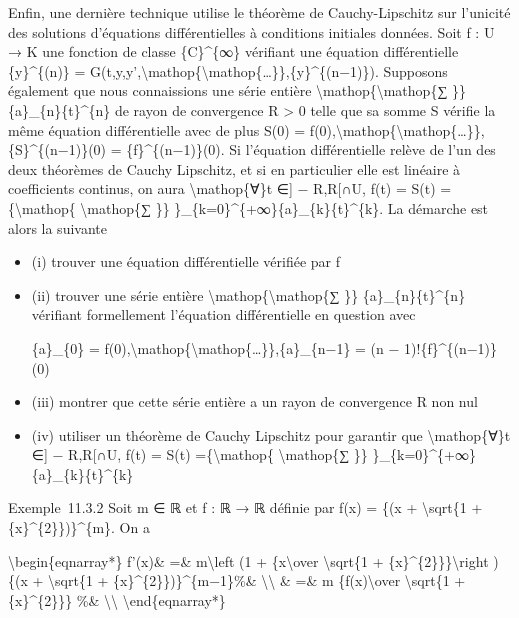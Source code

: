 \documentclass[]{article}
\begin{document}
Enfin, une dernière technique utilise le théorème de Cauchy-Lipschitz
sur l'unicité des solutions d'équations différentielles à conditions
initiales données. Soit f : U → K une fonction de classe \{C\}\^{}\{∞\}
vérifiant une équation différentielle \{y\}\^{}\{(n)\} =
G(t,y,y',\textbackslash{}mathop\{\textbackslash{}mathop\{\ldots{}\}\},\{y\}\^{}\{(n−1)\}).
Supposons également que nous connaissions une série entière
\textbackslash{}mathop\{\textbackslash{}mathop\{∑ \}\}
\{a\}\_\{n\}\{t\}\^{}\{n\} de rayon de convergence R \textgreater{} 0
telle que sa somme S vérifie la même équation différentielle avec de
plus S(0) =
f(0),\textbackslash{}mathop\{\textbackslash{}mathop\{\ldots{}\}\},\{S\}\^{}\{(n−1)\}(0)
= \{f\}\^{}\{(n−1)\}(0). Si l'équation différentielle relève de l'un des
deux théorèmes de Cauchy Lipschitz, et si en particulier elle est
linéaire à coefficients continus, on aura \textbackslash{}mathop\{∀\}t
∈{]} − R,R{[}∩U, f(t) = S(t) =\{\textbackslash{}mathop\{
\textbackslash{}mathop\{∑ \}\}
\}\_\{k=0\}\^{}\{+∞\}\{a\}\_\{k\}\{t\}\^{}\{k\}. La démarche est alors
la suivante

\begin{itemize}
\item
  (i) trouver une équation différentielle vérifiée par f
\item
  (ii) trouver une série entière
  \textbackslash{}mathop\{\textbackslash{}mathop\{∑ \}\}
  \{a\}\_\{n\}\{t\}\^{}\{n\} vérifiant formellement l'équation
  différentielle en question avec

  \{a\}\_\{0\} =
  f(0),\textbackslash{}mathop\{\textbackslash{}mathop\{\ldots{}\}\},\{a\}\_\{n−1\}
  = (n − 1)!\{f\}\^{}\{(n−1)\}(0)
\item
  (iii) montrer que cette série entière a un rayon de convergence R non
  nul
\item
  (iv) utiliser un théorème de Cauchy Lipschitz pour garantir que
  \textbackslash{}mathop\{∀\}t ∈{]} − R,R{[}∩U, f(t) = S(t)
  =\{\textbackslash{}mathop\{ \textbackslash{}mathop\{∑ \}\}
  \}\_\{k=0\}\^{}\{+∞\}\{a\}\_\{k\}\{t\}\^{}\{k\}
\end{itemize}

Exemple~11.3.2 Soit m ∈ ℝ et f : ℝ → ℝ définie par f(x) = \{(x +
\textbackslash{}sqrt\{1 + \{x\}\^{}\{2\}\})\}\^{}\{m\}. On a

\textbackslash{}begin\{eqnarray*\} f'(x)\& =\& m\textbackslash{}left (1
+ \{x\textbackslash{}over \textbackslash{}sqrt\{1 +
\{x\}\^{}\{2\}\}\}\textbackslash{}right )\{(x + \textbackslash{}sqrt\{1
+ \{x\}\^{}\{2\}\})\}\^{}\{m−1\}\%\& \textbackslash{}\textbackslash{} \&
=\& m \{f(x)\textbackslash{}over \textbackslash{}sqrt\{1 +
\{x\}\^{}\{2\}\}\} \%\& \textbackslash{}\textbackslash{}
\textbackslash{}end\{eqnarray*\}
\end{document}
